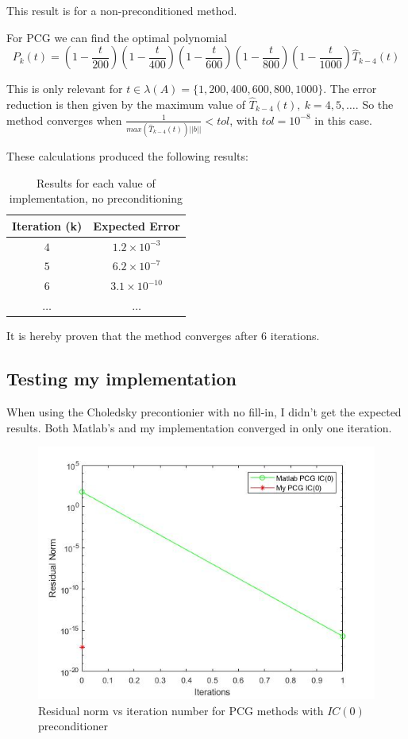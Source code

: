 \documentclass[a4paper, 11pt]{article}
\begin{document}
			This result is for a non-preconditioned method.
			
			For PCG we can find the optimal polynomial
			\begin{equation}
				P_k(t) = \left(1-\frac{t}{200}\right)\left(1-\frac{t}{400}\right)\left(1-\frac{t}{600}\right)\left(1-\frac{t}{800}\right)\left(1-\frac{t}{1000}\right)\hat{T}_{k-4}(t)
			\end{equation}
		
			This is only relevant for $t \in \lambda(A) = \{1,200,400,600,800,1000\}$.
			The error reduction is then given by the maximum value of $ \hat{T}_{k-4}(t),\ k=4,5,\ldots $.
			So the method converges when $\frac{1}{max(\hat{T}_{k-4}(t))||b||} < tol$, with $tol = 10^{-8}$ in this case.
			
			These calculations produced the following results:
			\begin{table}[H]
				\centering
				\begin{tabular}{c|c}
					\textbf{Iteration (k)} 	& \textbf{Expected Error} \\ \hline
					$4$ 					& $ 1.2 \times 10^{-3} $ 	\\ \hline	
					$5$						& $ 6.2 \times 10^{-7} $	\\ \hline
					$6$						& $ 3.1 \times 10^{-10} $	\\	\hline
					$\ldots$				& $ \ldots $	\\
				\end{tabular}
				\caption{Results for each value of implementation, no preconditioning}
				\label{table:ex3_theory}
			\end{table}
		
			It is hereby proven that the method converges after 6 iterations.		
			
			\subsection*{Testing my implementation}
			When using the Choledsky precontionier with no fill-in, I didn't get the expected results.
			Both Matlab's and my implementation converged in only one iteration.
			
			\begin{figure}[H]
				\centering
				\includegraphics[width=.6\linewidth]{ex3.jpg}
				\caption{Residual norm vs iteration number for PCG methods with $IC(0)$ preconditioner}
				\label{fig:ex3}
			\end{figure}
		
\end{document}
